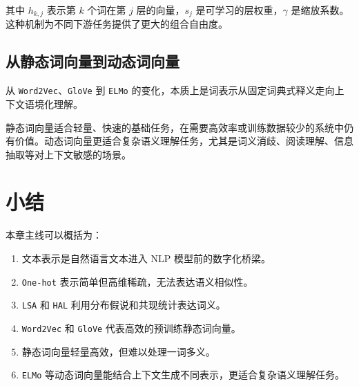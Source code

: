 其中 $h_{k,j}$ 表示第 $k$ 个词在第 $j$ 层的向量，$s_j$ 是可学习的层权重，$\gamma$ 是缩放系数。这种机制为不同下游任务提供了更大的组合自由度。

\subsection{从静态词向量到动态词向量}

从 \texttt{Word2Vec}、\texttt{GloVe} 到 \texttt{ELMo} 的变化，本质上是词表示从固定词典式释义走向上下文语境化理解。

静态词向量适合轻量、快速的基础任务，在需要高效率或训练数据较少的系统中仍有价值。动态词向量更适合复杂语义理解任务，尤其是词义消歧、阅读理解、信息抽取等对上下文敏感的场景。

\section{小结}

本章主线可以概括为：
\begin{enumerate}
  \item 文本表示是自然语言文本进入 NLP 模型前的数字化桥梁。
  \item \texttt{One-hot} 表示简单但高维稀疏，无法表达语义相似性。
  \item \texttt{LSA} 和 \texttt{HAL} 利用分布假说和共现统计表达词义。
  \item \texttt{Word2Vec} 和 \texttt{GloVe} 代表高效的预训练静态词向量。
  \item 静态词向量轻量高效，但难以处理一词多义。
  \item \texttt{ELMo} 等动态词向量能结合上下文生成不同表示，更适合复杂语义理解任务。
\end{enumerate}
